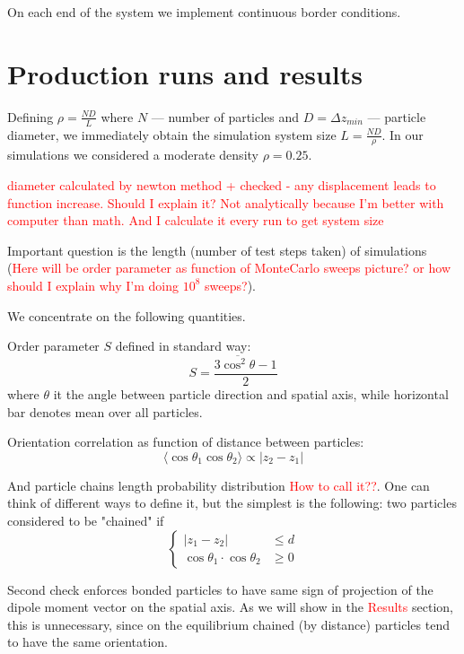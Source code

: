 \documentclass[12pt,a4paper]{article}
\begin{document}
On each end of the system we implement continuous border conditions.

\section{Production runs and results}

Defining $\rho = \frac{N D}{L}$ where $N$ --- number of particles and $D = \Delta z_{min}$ --- particle diameter, we immediately obtain the simulation system size $L = \frac{N D}{\rho}$. In our simulations we considered a moderate density $\rho = 0.25$.

\textcolor{red}{diameter calculated by newton method + checked - any displacement leads to function increase. Should I explain it? Not analytically because I'm better with computer than math. And I calculate it every run to get system size}

Important question is the length (number of test steps taken) of simulations (\textcolor{red}{Here will be order parameter as function of MonteCarlo sweeps picture? or how should I explain why I'm doing $10^8$ sweeps?}).

We concentrate on the following quantities.

Order parameter $S$ defined in standard way:
\begin{equation}
S = \frac{3 \overline{\cos^2 \theta} - 1}{2}
\end{equation}
where $\theta$ it the angle between particle direction and spatial axis, while horizontal bar denotes mean over all particles.

Orientation correlation as function of distance between particles:
\begin{equation}
\langle\cos \theta_1 \cos \theta_2\rangle \propto |z_2 - z_1|
\end{equation}

And particle chains length probability distribution \textcolor{red}{How to call it??}. One can think of different ways to define it, but the simplest is the following: two particles considered to be "chained" if 
\begin{equation}
\begin{cases}
	|z_1 - z_2| &\leq d\\
	\cos \theta_1 \cdot \cos \theta_2 &\geq 0
\end{cases}
\end{equation}

Second check enforces bonded particles to have same sign of projection of the dipole moment vector on the spatial axis. As we will show in the \textcolor{red}{Results} section, this is unnecessary, since on the equilibrium chained (by distance) particles tend to have the same orientation.
\end{document}
